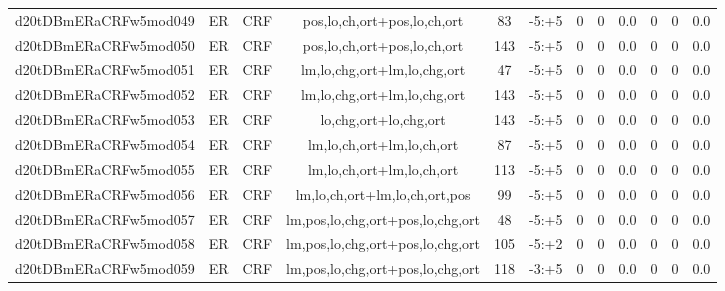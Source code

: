 \documentclass[a4paper]{article}
\begin{document}
\begin{landscape}
\begin{center}
\begin{tabular}{ |c|c|c|c|c|c|c|c|c|c|c|c|}
 
 	
 	\small{ d20tDBmERaCRFw5mod049 } & ER & CRF & pos,lo,ch,ort+pos,lo,ch,ort  &  83 &  -5:+5  &  0 & 0 & 0.0  &  0 & 0 & 0.0 \\
 	

 
 	
 	\small{ d20tDBmERaCRFw5mod050 } & ER & CRF & pos,lo,ch,ort+pos,lo,ch,ort  &  143 &  -5:+5  &  0 & 0 & 0.0  &  0 & 0 & 0.0 \\
 	

 
 	
 	\small{ d20tDBmERaCRFw5mod051 } & ER & CRF & lm,lo,chg,ort+lm,lo,chg,ort  &  47 &  -5:+5  &  0 & 0 & 0.0  &  0 & 0 & 0.0 \\
 	

 
 	
 	\small{ d20tDBmERaCRFw5mod052 } & ER & CRF & lm,lo,chg,ort+lm,lo,chg,ort  &  143 &  -5:+5  &  0 & 0 & 0.0  &  0 & 0 & 0.0 \\
 	

 
 	
 	\small{ d20tDBmERaCRFw5mod053 } & ER & CRF & lo,chg,ort+lo,chg,ort  &  143 &  -5:+5  &  0 & 0 & 0.0  &  0 & 0 & 0.0 \\
 	

 
 	
 	\small{ d20tDBmERaCRFw5mod054 } & ER & CRF & lm,lo,ch,ort+lm,lo,ch,ort  &  87 &  -5:+5  &  0 & 0 & 0.0  &  0 & 0 & 0.0 \\
 	

 
 	
 	\small{ d20tDBmERaCRFw5mod055 } & ER & CRF & lm,lo,ch,ort+lm,lo,ch,ort  &  113 &  -5:+5  &  0 & 0 & 0.0  &  0 & 0 & 0.0 \\
 	

 
 	
 	\small{ d20tDBmERaCRFw5mod056 } & ER & CRF & lm,lo,ch,ort+lm,lo,ch,ort,pos  &  99 &  -5:+5  &  0 & 0 & 0.0  &  0 & 0 & 0.0 \\
 	

 
 	
 	\small{ d20tDBmERaCRFw5mod057 } & ER & CRF & lm,pos,lo,chg,ort+pos,lo,chg,ort  &  48 &  -5:+5  &  0 & 0 & 0.0  &  0 & 0 & 0.0 \\
 	

 
 	
 	\small{ d20tDBmERaCRFw5mod058 } & ER & CRF & lm,pos,lo,chg,ort+pos,lo,chg,ort  &  105 &  -5:+2  &  0 & 0 & 0.0  &  0 & 0 & 0.0 \\
 	

 
 	
 	\small{ d20tDBmERaCRFw5mod059 } & ER & CRF & lm,pos,lo,chg,ort+pos,lo,chg,ort  &  118 &  -3:+5  &  0 & 0 & 0.0  &  0 & 0 & 0.0 \\
 	


\end{tabular}
\end{center}
\end{landscape}
\end{document}
